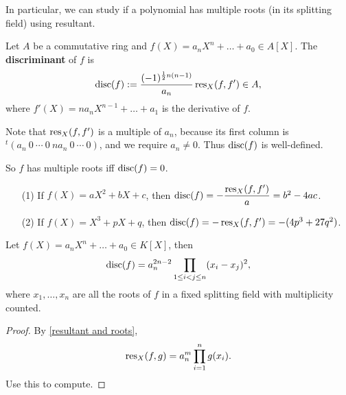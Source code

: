 In particular, we can study if a polynomial has multiple roots (in its splitting field) using resultant.
\begin{definition}
    Let $A$ be a commutative ring and $f(X) = a_nX^n + \dots + a_0\in A[X]$.
    The \textbf{discriminant} of $f$ is\[\operatorname{disc}(f) := \frac{(-1)^{\frac{1}{2}n(n-1)}}{a_n}\operatorname{res}_X(f, f')\in A,\]
    where $f'(X) = na_nX^{n - 1} + \dots + a_1$ is the derivative of $f$.

    Note that $\operatorname{res}_X(f, f')$ is a multiple of $a_n$,
    because its first column is $^t(a_n\ 0\ \cdots\ 0\ na_n\ 0\ \cdots\ 0)$, and we require $a_n\ne 0$. Thus $\operatorname{disc}(f)$ is well-defined.
\end{definition}
So $f$ has multiple roots iff $\operatorname{disc}(f) = 0$.
\begin{example}
    \begin{enumerate}
        \item [(1)] If $f(X) = aX^2 + bX + c$,
        then $\operatorname{disc}(f) = -\dfrac{\operatorname{res}_X(f, f')}{a} =b^2 - 4ac$.
        \item [(2)] If $f(X) = X^3 + pX + q$,
        then $\operatorname{disc}(f) = -\operatorname{res}_X(f, f') = -(4p^3 + 27q^2)$.
    \end{enumerate}
    \end{example}
    
\begin{proposition}\label{discriminant and roots}
    Let $f(X) = a_nX^n + \dots + a_0\in K[X]$,
    then \[\operatorname{disc}(f) = a_n^{2n-2}\prod_{1\le i < j\le n}(x_i - x_j)^2,\]
    where $x_1, \dots, x_n$ are all the roots of $f$ in a fixed splitting field with multiplicity counted.
\end{proposition}
\begin{proof}
    By \cref{resultant and roots},
    \[\operatorname{res}_X(f, g) = a_n^m\prod_{i = 1}^n g(x_i).\]
    Use this to compute.
\end{proof}
